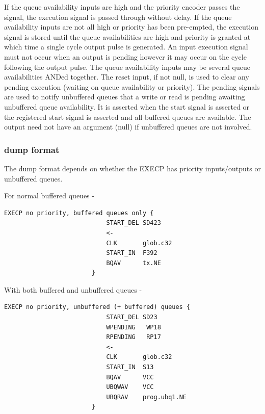 \documentclass[10pt,a4paper,twoside,fleqn]{book}
\begin{document}
                    If the queue availability inputs are high and the priority
                    encoder passes the signal, the execution signal is passed
                    through without delay. If the queue availability inputs are not
                    all high or priority has been pre-empted, the execution signal
                    is stored until the queue availabilities are high and priority
                    is granted at which time a single cycle output pulse is
                    generated. An input execution signal must not occur when an
                    output is pending however it may occur on the cycle following
                    the output pulse. The queue availability inputs may be several
                    queue availabilities ANDed together. The reset input, if not
                    null, is used to clear any pending execution (waiting on queue
                    availability or priority). The pending signals are used to
                    notify unbuffered queues that a write or read is pending
                    awaiting unbuffered queue availability. It is asserted when the
                    start signal is asserted or the registered start signal is
                    asserted and all buffered queues are available. The output need
                    not have an argument (null) if unbuffered queues are not
                    involved.

                \subsubsection{dump format}
                    
                    The dump format depends on whether the EXECP has priority
                    inputs/outputs or unbuffered queues.
                    
                    For normal buffered queues -
                    \begin{lstlisting}[gobble=20, language=tde]
                        EXECP no priority, buffered queues only {
	                        START_DEL SD423
	                        <-
	                        CLK       glob.c32
	                        START_IN  F392
	                        BQAV      tx.NE
                        }
                    \end{lstlisting}

                    With both buffered and unbuffered queues -
                    \begin{lstlisting}[gobble=20, language=tde]
                        EXECP no priority, unbuffered (+ buffered) queues {
	                        START_DEL SD23
	                        WPENDING   WP18
	                        RPENDING   RP17
	                        <-
	                        CLK       glob.c32
	                        START_IN  S13
	                        BQAV      VCC
	                        UBQWAV    VCC
	                        UBQRAV    prog.ubq1.NE
                        }
                    \end{lstlisting}
                    
\end{document}
